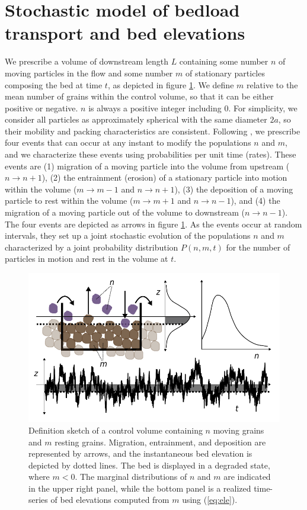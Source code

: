 \section{Stochastic model of bedload transport and bed elevations}
\label{sec:model}

We prescribe a volume of downstream length $L$ containing some number $n$ of moving particles in the flow and some number $m$ of stationary particles composing the bed at time $t$, as depicted in figure \ref{fig:definition}. We define $m$ relative to the mean number of grains within the control volume, so that it can be either positive or negative. $n$ is always a positive integer including $0$.
For simplicity, we consider all particles as approximately spherical with the same diameter $2a$, so their mobility and packing characteristics are consistent.
Following \citet{Ancey2008}, we prescribe four events that can occur at any instant to modify the populations $n$ and $m$, and we characterize these events using probabilities per unit time (rates).
These events are (1) migration of a moving particle into the volume from upstream ($n \rightarrow n+1$), (2) the entrainment (erosion) of a stationary particle into motion within the volume ($m\rightarrow m-1$ and $n\rightarrow n+1$), (3) the deposition of a moving particle to rest within the volume ($m\rightarrow m+1$ and $n\rightarrow n-1$), and (4) the migration of a moving particle out of the volume to downstream ($n\rightarrow n-1$).
The four events are depicted as arrows in figure \ref{fig:definition}.
As the events occur at random intervals, they set up a joint stochastic evolution of the populations $n$ and $m$ characterized by a joint probability distribution $P(n,m,t)$ for the number of particles in motion and rest in the volume at $t$.
\begin{figure}[!htbp]
	\includegraphics[width=\linewidth,keepaspectratio]{./figures/ch3/definition.pdf}
	\caption{Definition sketch of a control volume containing $n$ moving grains and $m$ resting grains. Migration, entrainment, and deposition are represented by arrows, and the instantaneous bed elevation is depicted by dotted lines. The bed is displayed in a degraded state, where $m<0$. The marginal distributions of $n$ and $m$ are indicated in the upper right panel, while the bottom panel is a realized time-series of bed elevations computed from $m$ using (\ref{eq:ele}).}
	\label{fig:definition}
\end{figure}
